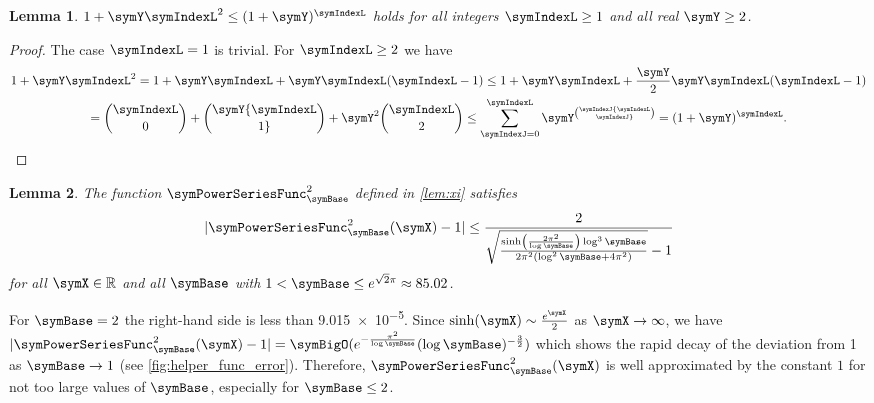\documentclass[sigconf, nonacm]{acmart}
\newtheorem{lemma}{Lemma}
\begin{document}
\begin{lemma}
\label{lemma:inequality2}
$1+\symY\symIndexL^2\leq (1+\symY)^\symIndexL$ holds for all integers $\symIndexL \geq 1$ and all real $\symY\geq2$.
\end{lemma}
\begin{proof}
The case $\symIndexL=1$ is trivial. For $\symIndexL\geq2$ we have
\begin{multline*}
1+\symY\symIndexL^2 = 1 + \symY\symIndexL + \symY\symIndexL(\symIndexL-1) \leq 
1 + \symY\symIndexL + \frac{\symY}{2} \symY\symIndexL(\symIndexL-1)
\\
=
{\symIndexL\choose 0}+\symY {\symIndexL\choose 1}+\symY^2 {\symIndexL\choose 2}
\leq
\sum_{\symIndexJ=0}^{\symIndexL}\symY^\symIndexJ {\symIndexL\choose \symIndexJ}
=
(1+\symY)^\symIndexL.
\end{multline*}
\end{proof}
\begin{lemma}
\label{lem:xi2_approx}
The function $\symPowerSeriesFunc_\symBase^2$ defined in \cref{lem:xi} satisfies
\begin{equation*}
|\symPowerSeriesFunc_\symBase^2(\symX) - 1| 
\leq 
\frac{2}{\sqrt{
\frac{\sinh\left(\frac{2\pi^2}{\log \symBase}\right)
\log^3 \symBase
}{
2\pi^2(\log^2\symBase+4\pi^2)
}
}
-1
}
\end{equation*}
for all $\symX\in\mathbb{R}$ and all $\symBase$ with $1 < \symBase \leq e^{\sqrt{2}\pi}\approx\num{85.02}$.
\end{lemma}
For $\symBase=2$ the right-hand side is less than \num{9.015e-5}. Since $\sinh(\symX) \sim \frac{e^\symX}{2}$ as $\symX\rightarrow\infty$, we have $|\symPowerSeriesFunc_\symBase^2(\symX) - 1| = \symBigO(e^{-\frac{\pi^2}{\log\symBase}}(\log\symBase)^{-\frac{3}{2}})$ which shows the rapid decay of the deviation from 1 as $\symBase\rightarrow 1$ (see \cref{fig:helper_func_error}). Therefore, $\symPowerSeriesFunc_\symBase^2(\symX)$ is well approximated by the constant $1$ for not too large values of $\symBase$, especially for $\symBase\leq 2$.
\end{document}
